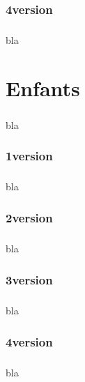 \subsection{4\ieme version}
\paragraph{}
bla

\chapter{Enfants}
\paragraph{}
bla

\subsection{1\ier version}
\paragraph{}
bla

\subsection{2\ieme version}
\paragraph{}
bla

\subsection{3\ieme version}
\paragraph{}
bla

\subsection{4\ieme version}
\paragraph{}
bla